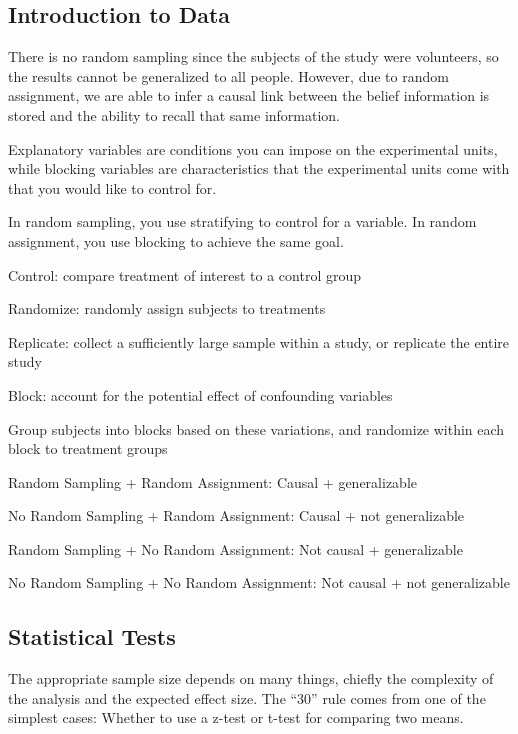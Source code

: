 \documentclass[]{book}
\theoremstyle{definition}
\theoremstyle{definition}
\theoremstyle{definition}
\theoremstyle{remark}
\begin{document}
\subsection*{Introduction to Data}\label{introduction-to-data}

There is no random sampling since the subjects of the study were
volunteers, so the results cannot be generalized to all people. However,
due to random assignment, we are able to infer a causal link between the
belief information is stored and the ability to recall that same
information.

Explanatory variables are conditions you can impose on the experimental
units, while blocking variables are characteristics that the
experimental units come with that you would like to control for.

In random sampling, you use stratifying to control for a variable. In
random assignment, you use blocking to achieve the same goal.

Control: compare treatment of interest to a control group

Randomize: randomly assign subjects to treatments

Replicate: collect a sufficiently large sample within a study, or
replicate the entire study

Block: account for the potential effect of confounding variables

Group subjects into blocks based on these variations, and randomize
within each block to treatment groups

Random Sampling + Random Assignment: Causal + generalizable

No Random Sampling + Random Assignment: Causal + not generalizable

Random Sampling + No Random Assignment: Not causal + generalizable

No Random Sampling + No Random Assignment: Not causal + not
generalizable

\subsection{Statistical Tests}\label{statistical-tests}

The appropriate sample size depends on many things, chiefly the
complexity of the analysis and the expected effect size. The ``30'' rule
comes from one of the simplest cases: Whether to use a z-test or t-test
for comparing two means.
\end{document}
